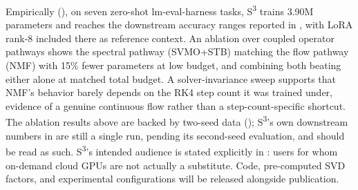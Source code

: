 \documentclass{scpe}
\newcommand{\sthree}{S\textsuperscript{3}}
\begin{document}
Empirically (), on seven zero-shot lm-eval-harness tasks, \sthree{} trains 3.90M parameters and reaches the downstream accuracy ranges reported in , with LoRA rank-8 included there as reference context. An ablation over coupled operator pathways shows the spectral pathway (SVMO+STB) matching the flow pathway (NMF) with 15\% fewer parameters at low budget, and combining both beating either alone at matched total budget. A solver-invariance sweep supports that NMF's behavior barely depends on the RK4 step count it was trained under, evidence of a genuine continuous flow rather than a step-count-specific shortcut. The ablation results above are backed by two-seed data (); \sthree{}'s own downstream numbers in  are still a single run, pending its second-seed evaluation, and should be read as such. \sthree{}'s intended audience is stated explicitly in : users for whom on-demand cloud GPUs are not actually a substitute. Code, pre-computed SVD factors, and experimental configurations will be released alongside publication.
\end{document}
